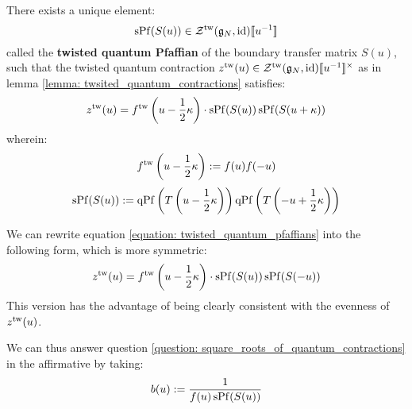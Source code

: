             \begin{corollary} \label{coro: twisted_quantum_pfaffians}
                There exists a unique element:
                    $$\operatorname{sPf}( S(u) ) \in \mathcal{Z}^{\mathrm{tw}}(\mathfrak{g}_N, \mathrm{id})[\![u^{-1}]\!]$$
                called the \textbf{twisted quantum Pfaffian} of the boundary transfer matrix $S(u)$, such that the twisted quantum contraction $z^{\tw}(u) \in \calZ^{\tw}(\g_N, \id)[\![u^{-1}]\!]^{\x}$ as in lemma \ref{lemma: twsited_quantum_contractions} satisfies:
                    \begin{equation} \label{equation: twisted_quantum_pfaffians}
                        z^{\mathrm{tw}}(u) = f^{\mathrm{tw}}\left( u - \frac12 \kappa \right) \cdot \operatorname{sPf}( S(u) ) \operatorname{sPf}( S(u + \kappa) )
                    \end{equation}
                wherein:
                    $$f^{\mathrm{tw}}\left( u - \frac12 \kappa \right) := f(u) f(-u)$$
                    $$\operatorname{sPf}( S(u) ) := \operatorname{qPf}\left( T\left( u - \frac12 \kappa \right) \right) \operatorname{qPf}\left( T\left( -u + \frac12 \kappa \right) \right)$$
            \end{corollary}
            \begin{remark}
                We can rewrite equation \eqref{equation: twisted_quantum_pfaffians} into the following form, which is more symmetric:
                    \begin{equation} \label{equation: }
                        z^{\mathrm{tw}}(u) = f^{\mathrm{tw}}\left( u - \frac12 \kappa \right) \cdot \operatorname{sPf}(  S(u) ) \operatorname{sPf}( S(-u) )
                    \end{equation}
                This version has the advantage of being clearly consistent with the evenness of $z^{\mathrm{tw}}(u)$.

                We can thus answer question \ref{question: square_roots_of_quantum_contractions} in the affirmative by taking:
                    $$b(u) := \frac{ 1 }{ f(u) \operatorname{sPf}( S(u) ) }$$
            \end{remark}
